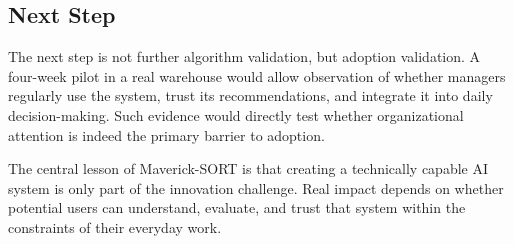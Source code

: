 \subsection{Next Step}

The next step is not further algorithm validation, but adoption validation. A four-week pilot in a real warehouse would allow observation of whether managers regularly use the system, trust its recommendations, and integrate it into daily decision-making. Such evidence would directly test whether organizational attention is indeed the primary barrier to adoption.

The central lesson of Maverick-SORT is that creating a technically capable AI system is only part of the innovation challenge. Real impact depends on whether potential users can understand, evaluate, and trust that system within the constraints of their everyday work.